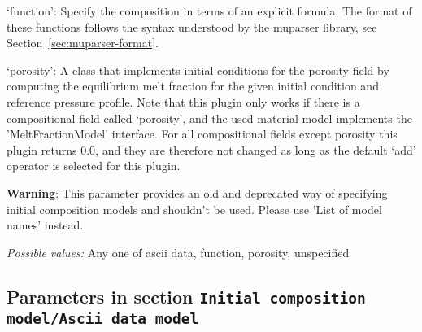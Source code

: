 \begin{itemize}
`function': Specify the composition in terms of an explicit formula. The format of these functions follows the syntax understood by the muparser library, see Section~\ref{sec:muparser-format}.

`porosity': A class that implements initial conditions for the porosity field by computing the equilibrium melt fraction for the given initial condition and reference pressure profile. Note that this plugin only works if there is a compositional field called `porosity', and the used material model implements the 'MeltFractionModel' interface. For all compositional fields except porosity this plugin returns 0.0, and they are therefore not changed as long as the default `add' operator is selected for this plugin.

\textbf{Warning}: This parameter provides an old and deprecated way of specifying initial composition models and shouldn't be used. Please use 'List of model names' instead.


{\it Possible values:} Any one of ascii data, function, porosity, unspecified
\end{itemize}



\subsection{Parameters in section \tt Initial composition model/Ascii data model}
\label{parameters:Initial_20composition_20model/Ascii_20data_20model}

